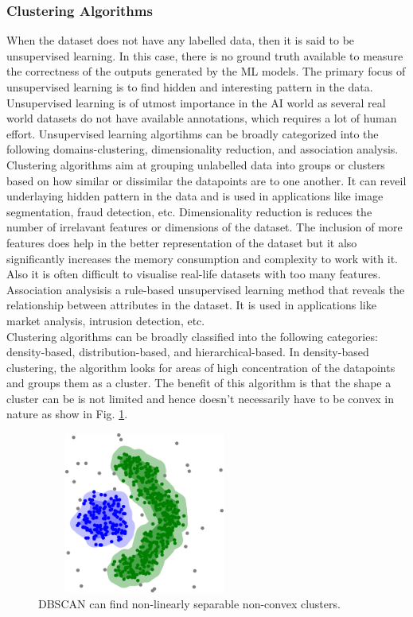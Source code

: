 \subsubsection{Clustering Algorithms}
When the dataset does not have any labelled data, then it is said to be unsupervised learning. In this case, there is no ground truth available to measure the correctness of the outputs generated by the \ac{ML} models. The primary focus of unsupervised learning is to find hidden and interesting pattern in the data. Unsupervised learning is of utmost importance in the \ac{AI} world as several real world datasets do not have available annotations, which requires a lot of human effort. Unsupervised learning algortihms can be broadly categorized into the following domains-clustering, dimensionality reduction, and association analysis. Clustering algorithms aim at grouping unlabelled data into groups or clusters based on how similar or dissimilar the datapoints are to one another. It can reveil underlaying hidden pattern in the data and is used in applications like image segmentation, fraud detection, etc. Dimensionality reduction is reduces the number of irrelavant features or dimensions of the dataset. The inclusion of more features does help in the better representation of the dataset but it also significantly increases the memory consumption and complexity to work with it. Also it is often difficult to visualise real-life datasets with too many features. Association analysisis a rule-based unsupervised learning method that reveals the relationship between attributes in the dataset. It is used in applications like market analysis, intrusion detection, etc.\\
Clustering algorithms can be broadly classified into the following categories: density-based, distribution-based, and hierarchical-based. In density-based clustering, the algorithm looks for areas of high concentration of the datapoints and groups them as a cluster. The benefit of this algorithm is that the shape a cluster can be is not limited and hence doesn't necessarily have to be convex in nature as show in Fig. \ref*{fig:dbscan}.
\begin{figure}[t]
    \centering
    \includegraphics[width=200pt,height=150pt]{pictures/DBSCAN-density-data.png}
    \caption{\ac{DBSCAN} can find non-linearly separable non-convex clusters.\cite{dbscanWiki}}
    \label{fig:dbscan}
\end{figure} 
